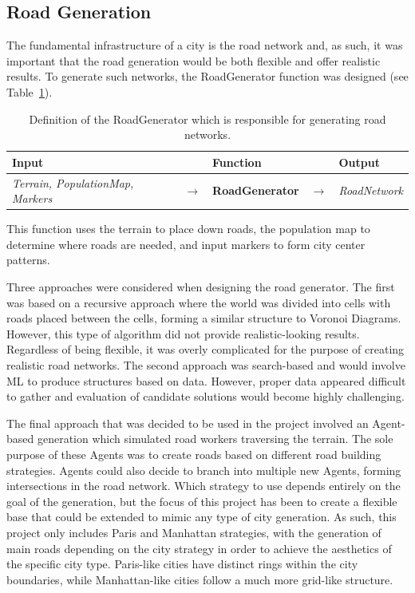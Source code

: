 \subsection{Road Generation}

The fundamental infrastructure of a city is the road network and, as such, it was important that the road generation would be both flexible and offer realistic results.
To generate such networks, the RoadGenerator function was designed (see Table~\ref{table:def_roadgen}).

\begin{table}[H]
  \centering
  \begin{tabular}{lllll}
    \textbf{Input} & & \textbf{Function} & & \textbf{Output} \\
    \midrule
    \textit{Terrain, PopulationMap, Markers} & $\rightarrow$ & \textbf{RoadGenerator}       & $\rightarrow$ & \textit{RoadNetwork}    \\
    \bottomrule
  \end{tabular}

  \caption{Definition of the RoadGenerator which is responsible for generating road networks.}
  \label{table:def_roadgen}
\end{table}
\vspace{-0.4cm}

This function uses the terrain to place down roads, the population map to determine where roads are needed, and input markers to form city center patterns.

Three approaches were considered when designing the road generator.
The first was based on a recursive approach where the world was divided into cells with roads placed between the cells, forming a similar structure to Voronoi Diagrams.
However, this type of algorithm did not provide realistic-looking results.
Regardless of being flexible, it was overly complicated for the purpose of creating realistic road networks.
The second approach was search-based and would involve ML to produce structures based on data.
However, proper data appeared difficult to gather and evaluation of candidate solutions would become highly challenging.

The final approach that was decided to be used in the project involved an Agent-based generation which simulated road workers traversing the terrain.
The sole purpose of these Agents was to create roads based on different road building strategies.
Agents could also decide to branch into multiple new Agents, forming intersections in the road network.
Which strategy to use depends entirely on the goal of the generation, but the focus of this project has been to create a flexible base that could be extended to mimic any type of city generation.
As such, this project only includes Paris and Manhattan strategies, with the generation of main roads depending on the city strategy in order to achieve the aesthetics of the specific city type.
Paris-like cities have distinct rings within the city boundaries, while Manhattan-like cities follow a much more grid-like structure.

